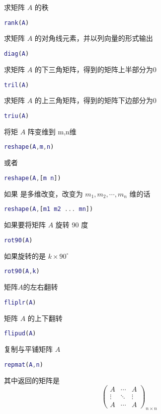 \documentclass{ctexart}
\begin{document}
 求矩阵 $A$ 的秩
 \begin{lstlisting}[language=matlab]
 rank(A)
 \end{lstlisting}

 求矩阵 $A$ 的对角线元素，并以列向量的形式输出
 \begin{lstlisting}[language=matlab]
 diag(A)
 \end{lstlisting}

 求矩阵 $A$ 的下三角矩阵，得到的矩阵上半部分为0
 \begin{lstlisting}[language=matlab]
 tril(A)
 \end{lstlisting}

 求矩阵 $A$ 的上三角矩阵，得到的矩阵下边部分为0
 \begin{lstlisting}[language=matlab]
 triu(A)
 \end{lstlisting}

 将矩 $A$ 阵变维到 m,n维
 \begin{lstlisting}[language=matlab]
 reshape(A,m,n)
 \end{lstlisting}
 或者
 \begin{lstlisting}[language=matlab]
 reshape(A,[m n])
 \end{lstlisting}
 如果 是多维改变，改变为 $m_1,m_2,\cdots,m_n$ 维的话
 \begin{lstlisting}[language=matlab]
 reshape(A,[m1 m2 ... mn])
 \end{lstlisting}

 如果要将矩阵 $A$ 旋转 90 度
 \begin{lstlisting}[language=matlab]
 rot90(A)
 \end{lstlisting}
 如果旋转的是 $k\times 90^\circ$
 \begin{lstlisting}[language=matlab]
 rot90(A,k)
 \end{lstlisting}

 矩阵$A$的左右翻转
 \begin{lstlisting}[language=matlab]
 fliplr(A)
 \end{lstlisting}

 矩阵 $A$ 的上下翻转
 \begin{lstlisting}[language=matlab]
 flipud(A)
 \end{lstlisting}
 
 复制与平铺矩阵 $A$ 
 \begin{lstlisting}[language=matlab]
 repmat(A,n)
 \end{lstlisting}
 其中返回的矩阵是
 $$\left(\begin{array}{cccc}
 A      & \cdots & A      \\
 \vdots & \ddots & \vdots \\
 A      & \cdots & A    
 \end{array}\right)_{n \times n}$$
\end{document}
